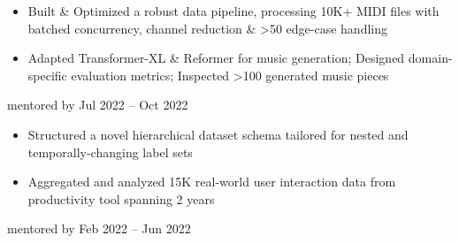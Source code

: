 {\begin{itemize}
        \item Built \& Optimized a robust data pipeline, processing 10K+ MIDI files with batched concurrency, channel reduction \& >50 edge-case handling

        \item Adapted Transformer-XL \& Reformer for music generation; Designed domain-specific evaluation metrics; Inspected >100 generated music pieces
    \end{itemize}
    \dividerSmall




        {{\bodyfontsize \color{body} mentored by} }
        {Jul 2022 -- Oct 2022}
        {}{}
    \begin{itemize}
        \item Structured a novel hierarchical dataset schema tailored for nested and temporally-changing label sets

        \item Aggregated and analyzed 15K real-world user interaction data from  productivity tool spanning 2 years

    \end{itemize}
    \dividerSmall


        {{\bodyfontsize \color{body} mentored by} }
        {Feb 2022 -- Jun 2022}
        {}{}
    \begin{itemize}


\end{itemize}}
